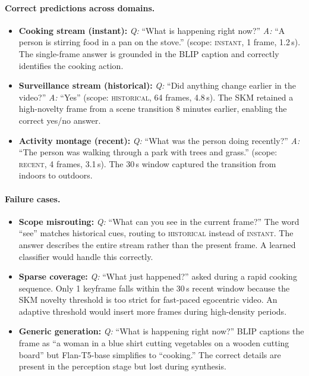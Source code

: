 \paragraph{Correct predictions across domains.}
\begin{itemize}[itemsep=4pt,leftmargin=*]
  \item \textbf{Cooking stream (instant):} \emph{Q:} ``What is happening right now?'' \emph{A:} ``A person is stirring food in a pan on the stove.'' (scope: \textsc{instant}, 1 frame, 1.2\,s). The single-frame answer is grounded in the BLIP caption and correctly identifies the cooking action.

  \item \textbf{Surveillance stream (historical):} \emph{Q:} ``Did anything change earlier in the video?'' \emph{A:} ``Yes'' (scope: \textsc{historical}, 64 frames, 4.8\,s). The SKM retained a high-novelty frame from a scene transition 8 minutes earlier, enabling the correct yes/no answer.

  \item \textbf{Activity montage (recent):} \emph{Q:} ``What was the person doing recently?'' \emph{A:} ``The person was walking through a park with trees and grass.'' (scope: \textsc{recent}, 4 frames, 3.1\,s). The 30\,s window captured the transition from indoors to outdoors.
\end{itemize}

\paragraph{Failure cases.}
\begin{itemize}[itemsep=4pt,leftmargin=*]
  \item \textbf{Scope misrouting:} \emph{Q:} ``What can you see in the current frame?'' The word ``see'' matches historical cues, routing to \textsc{historical} instead of \textsc{instant}. The answer describes the entire stream rather than the present frame. A learned classifier would handle this correctly.

  \item \textbf{Sparse coverage:} \emph{Q:} ``What just happened?'' asked during a rapid cooking sequence. Only 1 keyframe falls within the 30\,s recent window because the SKM novelty threshold is too strict for fast-paced egocentric video. An adaptive threshold would insert more frames during high-density periods.

  \item \textbf{Generic generation:} \emph{Q:} ``What is happening right now?'' BLIP captions the frame as ``a woman in a blue shirt cutting vegetables on a wooden cutting board'' but Flan-T5-base simplifies to ``cooking.'' The correct details are present in the perception stage but lost during synthesis.
\end{itemize}

